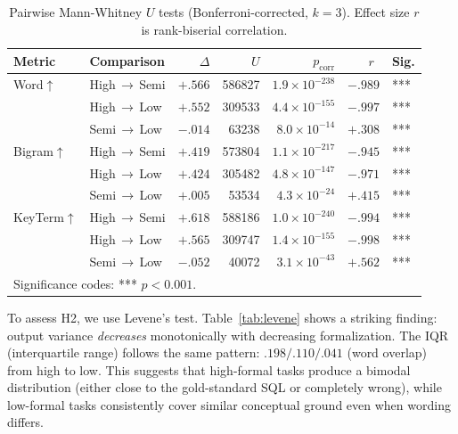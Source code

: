 \documentclass[runningheads]{llncs}
\begin{document}
\begin{table}[htbp]
\centering
\caption{Pairwise Mann-Whitney $U$ tests (Bonferroni-corrected, $k\!=\!3$). Effect size $r$ is rank-biserial correlation.}
\label{tab:pairwise}
\setlength{\tabcolsep}{5pt}
\begin{tabular}{llrrrrl}
\toprule
Metric & Comparison & $\Delta$ & $U$ & $p_{\text{corr}}$ & $r~~$ & Sig. \\
\midrule
Word$\uparrow$
  & High$\,\to\,$Semi & $+.566$ & 586827 & $1.9 \times 10^{-238}$ & $-.989$ & *** \\
  & High$\,\to\,$Low  & $+.552$ & 309533 & $4.4 \times 10^{-155}$ & $-.997$ & *** \\
  & Semi$\,\to\,$Low  & $-.014$ & 63238 & $8.0 \times 10^{-14}$ & $+.308$ & *** \\
\midrule
Bigram$\uparrow$
  & High$\,\to\,$Semi & $+.419$ & 573804 & $1.1 \times 10^{-217}$ & $-.945$ & *** \\
  & High$\,\to\,$Low  & $+.424$ & 305482 & $4.8 \times 10^{-147}$ & $-.971$ & *** \\
  & Semi$\,\to\,$Low  & $+.005$ & 53534 & $4.3 \times 10^{-24}$ & $+.415$ & *** \\
\midrule
KeyTerm$\uparrow$
  & High$\,\to\,$Semi & $+.618$ & 588186 & $1.0 \times 10^{-240}$ & $-.994$ & *** \\
  & High$\,\to\,$Low  & $+.565$ & 309747 & $1.4 \times 10^{-155}$ & $-.998$ & *** \\
  & Semi$\,\to\,$Low  & $-.052$ & 40072 & $3.1 \times 10^{-43}$ & $+.562$ & *** \\
\bottomrule
\multicolumn{4}{l}{\scriptsize Significance codes: *** $p < 0.001$.}
\end{tabular}
\end{table}

To assess H2, we use Levene's test. Table~\ref{tab:levene} shows a striking finding: output variance \emph{decreases} monotonically with decreasing formalization.
The IQR (interquartile range) follows the same pattern: $.198/.110/.041$ (word overlap) from high to low. This suggests that high-formal tasks produce a bimodal distribution (either close to the gold-standard SQL or completely wrong), while low-formal tasks consistently cover similar conceptual ground even when wording differs.
\end{document}
